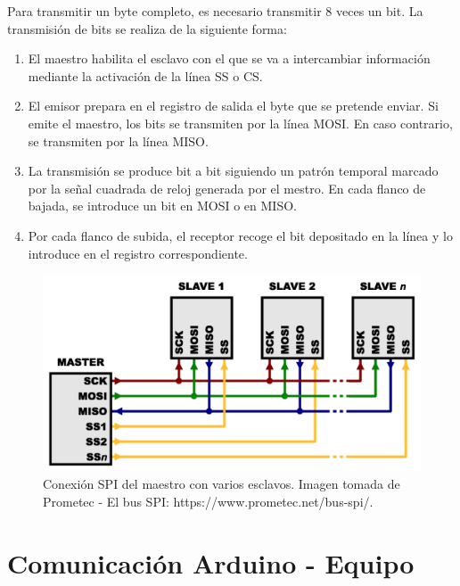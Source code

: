 Para transmitir un byte completo, es necesario transmitir 8 veces un bit. La transmisión de bits se realiza de la siguiente forma:
\begin{enumerate}
    \item El maestro habilita el esclavo con el que se va a intercambiar información mediante la activación de la línea SS o CS.
    \item El emisor prepara en el registro de salida el byte que se pretende enviar. Si emite el maestro, los bits se transmiten por la línea MOSI. En caso contrario, se transmiten por la línea MISO.
    \item La transmisión se produce bit a bit siguiendo un patrón temporal marcado por la señal cuadrada de reloj generada por el mestro. En cada flanco de bajada, se introduce un bit en MOSI o en MISO.
    \item Por cada flanco de subida, el receptor recoge el bit depositado en la línea y lo introduce en el registro correspondiente.
\end{enumerate}

\begin{figure}
\centering
\includegraphics[scale = 0.5]{capitulo_02/figuras_dir/SPI.jpg}
\caption{Conexión SPI del maestro con varios esclavos. Imagen tomada de Prometec - El bus SPI: https://www.prometec.net/bus-spi/.}
\label{fig: SPI}
\end{figure}

\clearpage
\section{Comunicación Arduino - Equipo} %

